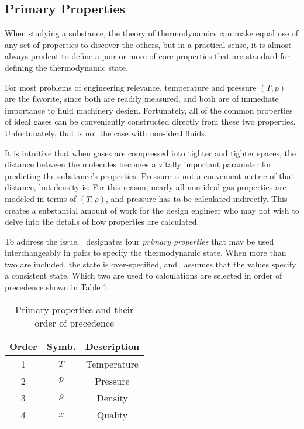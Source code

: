 \subsection{Primary Properties}

When studying a substance, the theory of thermodynamics can make equal use of any set of properties to discover the others, but in a practical sense, it is almost always prudent to define a pair or more of core properties that are standard for defining the thermodynamic state.  

For most problems of engineering relevance, temperature and pressure $(T,p)$ are the favorite, since both are readily measured, and both are of immediate importance to fluid machinery design.  Fortunately, all of the common properties of ideal gases can be conveniently constructed directly from these two properties.  Unfortunately, that is not the case with non-ideal fluids.

It is intuitive that when gases are compressed into tighter and tighter spaces, the distance between the molecules becomes a vitally important parameter for predicting the substance's properties.  Pressure is not a convenient metric of that distance, but density is.  For this reason, nearly all non-ideal gas properties are modeled in terms of $(T,\rho)$, and pressure has to be calculated indirectly.  This creates a substantial amount of work for the design engineer who may not wish to delve into the details of how properties are calculated.

To address the issue, \PM\ designates four \emph{primary properties} that may be used interchangeably in pairs to specify the thermodynamic state.  When more than two are included, the state is over-specified, and \PM\ assumes that the values specify a consistent state.  Which two are used to calculations are selected in order of precedence shown in Table \ref{tab:primary}.

\begin{table}
\centering
\caption{Primary properties and their order of precedence}\label{tab:primary}
\begin{tabular}{|ccc|}
\hline
Order & Symb. & Description\\
\hline
1 & $T$ & Temperature\\
2 & $p$ & Pressure\\
3 & $\rho$ & Density\\
4 & $x$ & Quality\\
\hline
\end{tabular}
\end{table}


